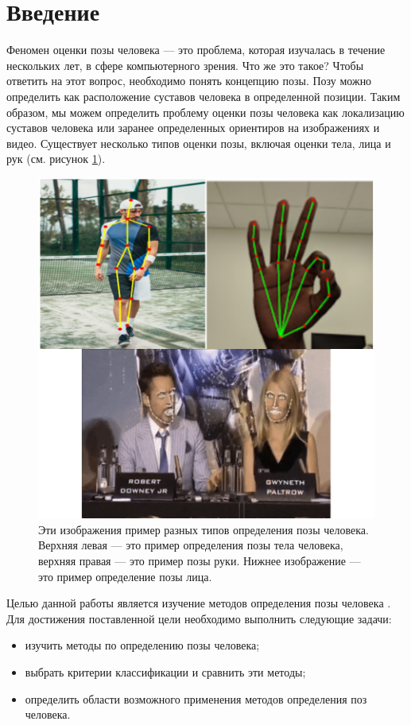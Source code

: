 
\chapter*{Введение}


Феномен оценки позы человека --- это проблема, которая изучалась в течение нескольких лет, в сфере компьютерного зрения. Что же это такое? Чтобы ответить на этот вопрос, необходимо понять концепцию позы. Позу можно определить как расположение суставов человека в определенной позиции. Таким образом, мы можем определить проблему оценки позы человека как локализацию суставов человека или заранее определенных ориентиров на изображениях и видео. Существует несколько типов оценки позы, включая оценки тела, лица и рук (см. рисунок \ref{img:human,hand,face}).

\begin{figure}[ht!]
	\centering
	\includegraphics[width=0.96\linewidth]{assets/thefirst.png}
	\caption{Эти изображения пример разных типов определения позы человека. Верхняя левая --- это пример определения позы тела человека, верхняя правая --- это пример позы руки. Нижнее изображение --- это пример определение позы лица.}
	\label{img:human,hand,face}
\end{figure}


Целью данной работы является изучение методов определения позы человека \cite{guide-hpe}. Для достижения поставленной цели необходимо выполнить следующие задачи:
\begin{itemize}
	\item изучить методы по определению позы человека;
	\item выбрать критерии классификации и сравнить эти методы;
	\item определить области возможного применения методов определения поз человека.
\end{itemize}
